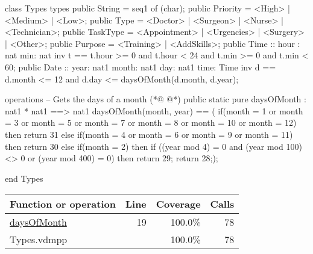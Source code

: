 \begin{vdmpp}[breaklines=true]
class Types
types
 public String = seq1 of (char);
 public Priority = <High> | <Medium> | <Low>;
 public Type = <Doctor> | <Surgeon> | <Nurse> | <Technician>;
 public TaskType = <Appointment> | <Urgencies> | <Surgery> | <Other>;
 public Purpose = <Training> | <AddSkills>;
 public Time :: hour : nat
         min: nat
 inv t == t.hour >= 0 and t.hour < 24 and t.min >= 0 and t.min < 60;
 public Date ::  year: nat1
         month: nat1
         day: nat1
         time: Time
 inv d == d.month <= 12 and d.day <= daysOfMonth(d.month, d.year);
 
operations
 -- Gets the days of a month
(*@
\label{daysOfMonth:19}
@*)
 public static pure daysOfMonth : nat1 * nat1 ==> nat1
  daysOfMonth(month, year) == (
              if(month = 1 or month = 3 or month = 5 or month = 7 or month = 8 or month = 10 or month = 12)
               then return 31
              else if(month = 4 or month = 6 or month = 9 or month = 11)
               then return 30
              else if(month = 2)
               then if ((year mod 4) = 0 and (year mod 100) <> 0 or (year mod 400) = 0)
                then return 29;
              return 28;);
                
end Types
\end{vdmpp}
\bigskip
\begin{longtable}{|l|r|r|r|}
\hline
Function or operation & Line & Coverage & Calls \\
\hline
\hline
\hyperref[daysOfMonth:19]{daysOfMonth} & 19&100.0\% & 78 \\
\hline
\hline
Types.vdmpp & & 100.0\% & 78 \\
\hline
\end{longtable}

